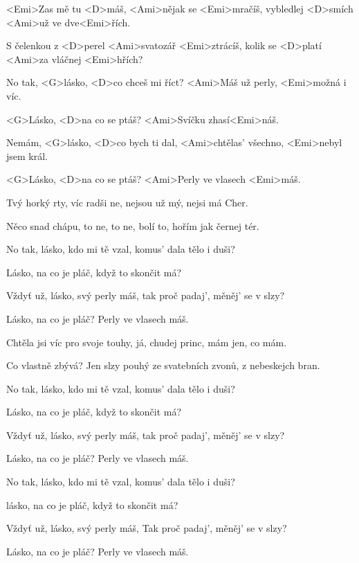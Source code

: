 

\zs
<Emi>Zas mě tu <D>máš, <Ami>nějak se <Emi>mračíš,
vybledlej <D>smích <Ami>už ve dve<Emi>řích.

S čelenkou z <D>perel <Ami>svatozář <Emi>ztrácíš,
kolik se <D>platí <Ami>za vláčnej <Emi>hřích?
\ks

\zr
No tak, <G>lásko, <D>co chceš mi říct?
<Ami>Máš už perly, <Emi>možná i víc.

<G>Lásko, <D>na co se ptáš? <Ami>Svíčku zhasí<Emi>náš.

Nemám, <G>lásko, <D>co bych ti dal,
<Ami>chtělas' všechno, <Emi>nebyl jsem král.

<G>Lásko, <D>na co se ptáš? <Ami>Perly ve vlasech <Emi>máš.
\kr

\zs
Tvý horký rty, víc radši ne,
nejsou už mý, nejsi má Cher.

Něco snad chápu, to ne, to ne,
bolí to, hořím jak černej tér.
\ks

\zs
No tak, lásko, kdo mi tě vzal,
komus' dala tělo i duši?

Lásko, na co je pláč,
když to skončit má?
\ks

\zs
Vždyť už, lásko, svý perly máš,
tak proč padaj', měněj' se v slzy?

Lásko, na co je pláč?
Perly ve vlasech máš.
\ks

\zr \kr

\zs
Chtěla jsi víc pro svoje touhy,
já, chudej princ, mám jen, co mám.

Co vlastně zbývá? Jen slzy pouhý
ze svatebních zvonů, z nebeskejch bran.
\ks

\zs
No tak, lásko, kdo mi tě vzal,
komus' dala tělo i duši?

Lásko, na co je pláč,
když to skončit má?
\ks

\zs
Vždyť už, lásko, svý perly máš,
tak proč padaj', měněj' se v slzy?

Lásko, na co je pláč?
Perly ve vlasech máš.
\ks

\zr \kr

\zr
No tak, lásko, kdo mi tě vzal,
komus' dala tělo i duši?

lásko, na co je pláč,
když to skončit má?
\kr

\zs
Vždyť už, lásko, svý perly máš,
Tak proč padaj', měněj' se v slzy?

Lásko, na co je pláč?
Perly ve vlasech máš.
\ks

\kp

